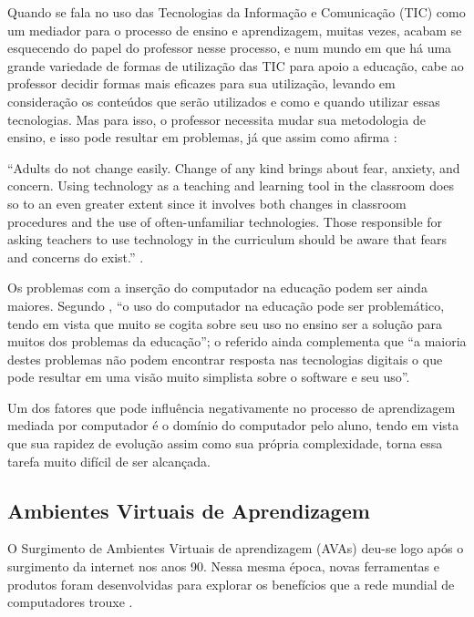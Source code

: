 Quando se fala no uso das Tecnologias da Informação e Comunicação (TIC) como um mediador para o processo de ensino e aprendizagem, muitas vezes, acabam se esquecendo do papel do professor nesse processo, e num mundo em que há uma grande variedade de formas de utilização das TIC para apoio a educação, cabe ao professor decidir formas mais eficazes para sua utilização, levando em consideração os conteúdos que serão utilizados e como e quando utilizar essas tecnologias. Mas para isso, o professor necessita mudar sua metodologia de ensino, e isso pode resultar em problemas, já que assim como afirma :

\begin{citacao}
``Adults do not change easily. Change of any kind brings about fear, anxiety, and concern. Using technology as a teaching and learning tool in the classroom does so to an even greater extent since it involves both changes in classroom procedures and the use of often-unfamiliar technologies. Those responsible for asking teachers to use technology in the curriculum should be aware that fears and concerns do exist.'' \cite{bitner2002integrating}.
\end{citacao}

Os problemas com a inserção do computador na educação podem ser ainda maiores. Segundo , ``o uso do computador na educação pode ser problemático, tendo em vista que muito se cogita sobre seu uso no ensino ser a solução para muitos dos problemas da educação''; o referido ainda complementa que ``a maioria destes problemas não podem encontrar resposta nas tecnologias digitais o que pode resultar em uma visão muito simplista sobre o software e seu uso''.

Um dos fatores que pode influência negativamente no processo de aprendizagem mediada por computador é o domínio do computador pelo aluno, tendo em vista que sua rapidez de evolução assim como sua própria complexidade, torna essa tarefa muito difícil de ser alcançada.



\subsection{Ambientes Virtuais de Aprendizagem}

O Surgimento de Ambientes Virtuais de aprendizagem (AVAs) deu-se logo após o surgimento da internet nos anos 90. Nessa mesma época, novas ferramentas e produtos foram desenvolvidas para explorar os benefícios que a rede mundial de computadores trouxe \cite{oleary2002virtual}.

